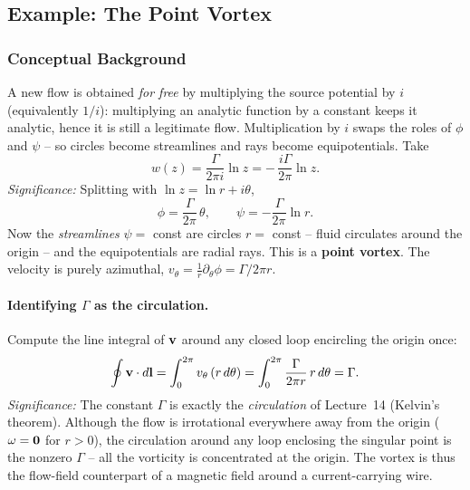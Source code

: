 \documentclass[../main.tex]{subfiles}
\begin{document}
\subsection{Example: The Point Vortex}\label{sec:lec17:vortex}

\subsubsection*{Conceptual Background}
A new flow is obtained \emph{for free} by multiplying the source potential by $i$ (equivalently $1/i$): multiplying an analytic function by a constant keeps it analytic, hence it is still a legitimate flow. Multiplication by $i$ swaps the roles of $\phi$ and $\psi$ -- so circles become streamlines and rays become equipotentials. Take
\begin{equation}
  \boxed{w(z) = \frac{\Gamma}{2\pi i}\ln z = -\,\frac{i\Gamma}{2\pi}\ln z.}
  \label{eq:lec17_vortex_w}
\end{equation}
\textit{Significance:} Splitting with $\ln z=\ln r+i\theta$,
\begin{equation}
  \phi = \frac{\Gamma}{2\pi}\,\theta,\qquad \psi = -\frac{\Gamma}{2\pi}\ln r .
  \label{eq:lec17_vortex_phipsi}
\end{equation}
Now the \emph{streamlines} $\psi=$ const are circles $r=$ const -- fluid circulates around the origin -- and the equipotentials are radial rays. This is a \textbf{point vortex}. The velocity is purely azimuthal, $v_\theta=\tfrac{1}{r}\partial_\theta\phi=\Gamma/2\pi r$.

\paragraph{Identifying $\Gamma$ as the circulation.} Compute the line integral of $\mathbf{v}$ around any closed loop encircling the origin once:
\begin{equation}
  \oint \mathbf{v}\cdot d\mathbf{l} = \int_0^{2\pi} v_\theta\,(r\,d\theta) = \int_0^{2\pi}\frac{\Gamma}{2\pi r}\,r\,d\theta = \Gamma.
  \label{eq:lec17_vortex_circ}
\end{equation}
\textit{Significance:} The constant $\Gamma$ is exactly the \emph{circulation} of Lecture~14 (Kelvin's theorem). Although the flow is irrotational everywhere away from the origin ($\mathbf{\omega}=\mathbf{0}$ for $r>0$), the circulation around any loop enclosing the singular point is the nonzero $\Gamma$ -- all the vorticity is concentrated at the origin. The vortex is thus the flow-field counterpart of a magnetic field around a current-carrying wire.
\end{document}
